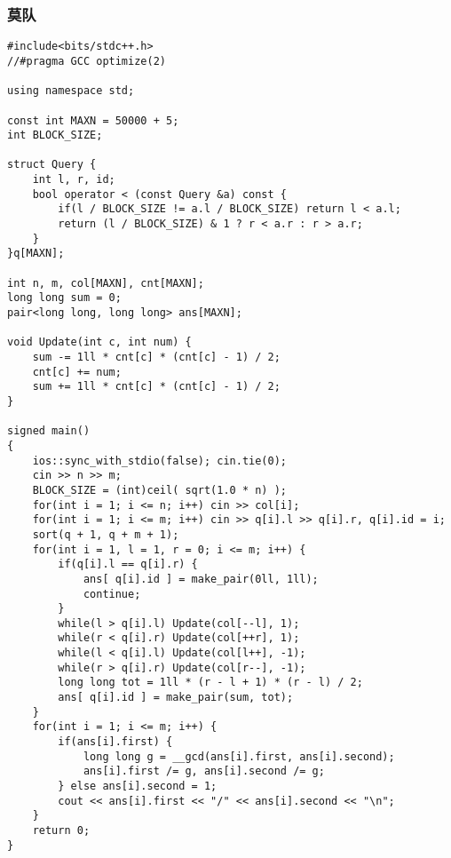 \subsubsection{莫队}
\begin{lstlisting}
#include<bits/stdc++.h>
//#pragma GCC optimize(2)

using namespace std;

const int MAXN = 50000 + 5;
int BLOCK_SIZE;

struct Query {
	int l, r, id;
	bool operator < (const Query &a) const {
		if(l / BLOCK_SIZE != a.l / BLOCK_SIZE) return l < a.l;
		return (l / BLOCK_SIZE) & 1 ? r < a.r : r > a.r;
	}
}q[MAXN];

int n, m, col[MAXN], cnt[MAXN];
long long sum = 0;
pair<long long, long long> ans[MAXN];

void Update(int c, int num) {
	sum -= 1ll * cnt[c] * (cnt[c] - 1) / 2;
	cnt[c] += num;
	sum += 1ll * cnt[c] * (cnt[c] - 1) / 2;
}

signed main()
{
	ios::sync_with_stdio(false); cin.tie(0);
	cin >> n >> m;
	BLOCK_SIZE = (int)ceil( sqrt(1.0 * n) );
	for(int i = 1; i <= n; i++) cin >> col[i];
	for(int i = 1; i <= m; i++) cin >> q[i].l >> q[i].r, q[i].id = i;
	sort(q + 1, q + m + 1);
	for(int i = 1, l = 1, r = 0; i <= m; i++) {
		if(q[i].l == q[i].r) {
			ans[ q[i].id ] = make_pair(0ll, 1ll);
			continue;
		}
		while(l > q[i].l) Update(col[--l], 1);
		while(r < q[i].r) Update(col[++r], 1);
		while(l < q[i].l) Update(col[l++], -1);
		while(r > q[i].r) Update(col[r--], -1);
		long long tot = 1ll * (r - l + 1) * (r - l) / 2;
		ans[ q[i].id ] = make_pair(sum, tot);
	}
	for(int i = 1; i <= m; i++) {
		if(ans[i].first) {
			long long g = __gcd(ans[i].first, ans[i].second);
			ans[i].first /= g, ans[i].second /= g;
		} else ans[i].second = 1;
		cout << ans[i].first << "/" << ans[i].second << "\n";
	}
	return 0;
}
\end{lstlisting}


